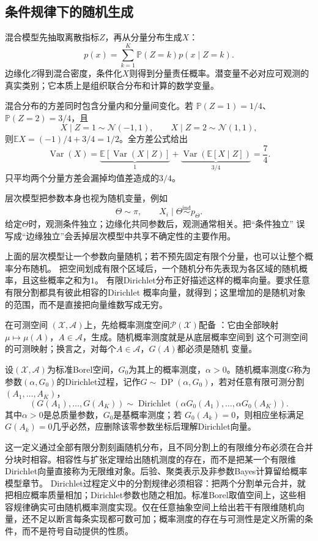 \subsection{条件规律下的随机生成}
\label{sec:rv-random-generation}
混合模型先抽取离散指标\(Z\)，再从分量分布生成\(X\)：
\[ p(x)=\sum_{k=1}^{K}\mathbb{P}(Z=k)p(x\mid Z=k). \]
边缘化\(Z\)得到混合密度，条件化\(X\)则得到分量责任概率。潜变量不必对应可观测的真实类别；它本质上是组织联合分布和计算的数学变量。

混合分布的方差同时包含分量内和分量间变化。若
\(\mathbb{P}(Z=1)=1/4\)、\(\mathbb{P}(Z=2)=3/4\)，且
\[
  X\mid Z=1\sim\mathcal{N}(-1,1),\qquad
  X\mid Z=2\sim\mathcal{N}(1,1),
\]
则\(\mathbb{E}X=(-1)/4+3/4=1/2\)。全方差公式给出
\[
  \operatorname{Var}(X)
  =\underbrace{\mathbb{E}[\operatorname{Var}(X\mid Z)]}_{1}
   +\underbrace{\operatorname{Var}(\mathbb{E}[X\mid Z])}_{3/4}
  =\frac74.
\]
只平均两个分量方差会漏掉均值差造成的\(3/4\)。

层次模型把参数本身也视为随机变量，例如
\[ \Theta\sim\pi,\qquad
  X_i\mid\Theta\mathrel{\overset{\mathrm{ind}}{\sim}}p_\Theta. \]
给定\(\Theta\)时，观测条件独立；边缘化共同参数后，观测通常相关。把“条件独立”
误写成“边缘独立”会丢掉层次模型中共享不确定性的主要作用。

上面的层次模型让一个参数向量随机；若不预先固定有限个分量，也可以让整个概率分布随机。
把空间划成有限个区域后，一个随机分布先表现为各区域的随机概率，且这些概率之和为$1$。
有限Dirichlet分布正好描述这样的概率向量。要求任意有限分割都具有彼此相容的Dirichlet
概率向量，就得到；这里增加的是随机对象的范围，而不是直接把向量维数写成无穷。
\begin{definition}[随机概率测度]
  \label{def:probability-random-probability-measure}
在可测空间
\((\mathcal X,\mathcal A)\)上，先给概率测度空间\(\mathcal P(\mathcal X)\)配备
：它由全部映射
\(\mu\mapsto\mu(A)\)，\(A\in\mathcal A\)，生成。随机概率测度就是从底层概率空间到
这个可测空间的可测映射；换言之，对每个\(A\in\mathcal A\)，\(G(A)\)都必须是随机
变量。
\end{definition}
\begin{definition}[Dirichlet过程]
  \label{def:probability-dirichlet-process}
  设\((\mathcal X,\mathcal A)\)为标准Borel空间，\(G_0\)为其上的概率测度，\(\alpha>0\)。随机概率测度\(G\)称为参数\((\alpha,G_0)\)的Dirichlet过程，记作\(G\sim\operatorname{DP}(\alpha,G_0)\)，若对任意有限可测分割
\((A_1,\ldots,A_K)\)，
\[ (G(A_1),\ldots,G(A_K))
  \sim\operatorname{Dirichlet}(\alpha G_0(A_1),\ldots,\alpha G_0(A_K)). \]
其中\(\alpha>0\)是总质量参数，\(G_0\)是基概率测度；若
\(G_0(A_k)=0\)，则相应坐标满足\(G(A_k)=0\)几乎必然，应删除该零参数坐标后理解Dirichlet向量。
\end{definition}
这一定义通过全部有限分割刻画随机分布，且不同分割上的有限维分布必须在合并分块时相容。相容性与扩张定理给出随机测度的存在，而不是把某一个有限维Dirichlet向量直接称为无限维对象。后验、聚类表示及非参数Bayes计算留给概率模型章节。
Dirichlet过程定义中的分割规律必须相容：把两个分割单元合并，就把相应概率质量相加；Dirichlet参数也随之相加。标准Borel取值空间上，这些相容规律确实可由随机概率测度实现。仅在任意抽象空间上给出若干有限维随机向量，还不足以断言每条实现都可数可加；概率测度的存在与可测性是定义所需的条件，而不是符号自动提供的性质。

